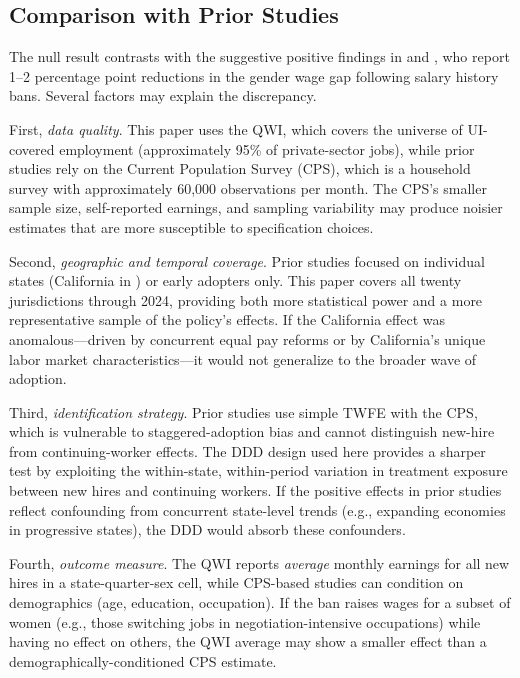 \documentclass[12pt]{article}
\begin{document}
\subsection{Comparison with Prior Studies}

The null result contrasts with the suggestive positive findings in \citet{hansen2020information} and \citet{sinha2023perpetuating}, who report 1--2 percentage point reductions in the gender wage gap following salary history bans. Several factors may explain the discrepancy.

First, \textit{data quality}. This paper uses the QWI, which covers the universe of UI-covered employment (approximately 95\% of private-sector jobs), while prior studies rely on the Current Population Survey (CPS), which is a household survey with approximately 60,000 observations per month. The CPS's smaller sample size, self-reported earnings, and sampling variability may produce noisier estimates that are more susceptible to specification choices.

Second, \textit{geographic and temporal coverage}. Prior studies focused on individual states (California in \citet{hansen2020information}) or early adopters only. This paper covers all twenty jurisdictions through 2024, providing both more statistical power and a more representative sample of the policy's effects. If the California effect was anomalous---driven by concurrent equal pay reforms or by California's unique labor market characteristics---it would not generalize to the broader wave of adoption.

Third, \textit{identification strategy}. Prior studies use simple TWFE with the CPS, which is vulnerable to staggered-adoption bias and cannot distinguish new-hire from continuing-worker effects. The DDD design used here provides a sharper test by exploiting the within-state, within-period variation in treatment exposure between new hires and continuing workers. If the positive effects in prior studies reflect confounding from concurrent state-level trends (e.g., expanding economies in progressive states), the DDD would absorb these confounders.

Fourth, \textit{outcome measure}. The QWI reports \textit{average} monthly earnings for all new hires in a state-quarter-sex cell, while CPS-based studies can condition on demographics (age, education, occupation). If the ban raises wages for a subset of women (e.g., those switching jobs in negotiation-intensive occupations) while having no effect on others, the QWI average may show a smaller effect than a demographically-conditioned CPS estimate.
\end{document}
